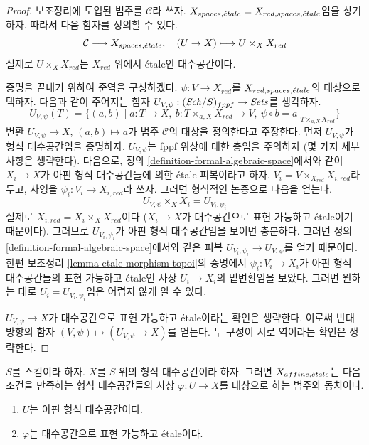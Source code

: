 \begin{proof}
보조정리에 도입된 범주를 $\mathcal{C}$라 쓰자.
$X_{spaces, {\acute{e}tale}} = X_{red, spaces, {\acute{e}tale}}$임을 상기하자.
따라서 다음 함자를 정의할 수 있다.
$$
\mathcal{C} \longrightarrow X_{spaces, {\acute{e}tale}},\quad
(U \to X) \longmapsto U \times_X X_{red}
$$
실제로 $U \times_X X_{red}$는 $X_{red}$ 위에서 \'etale인
대수공간이다.

\medskip\noindent
증명을 끝내기 위하여 준역을 구성하겠다.
$\psi : V \to X_{red}$를 $X_{red, spaces, {\acute{e}tale}}$의 대상으로
택하자. 다음과 같이 주어지는 함자
$U_{V, \psi} : (\mathit{Sch}/S)_{fppf} \to \textit{Sets}$를 생각하자.
$$
U_{V, \psi}(T) = \{(a, b) \mid
a : T \to X,
\ b : T \times_{a, X} X_{red} \to V,
\ \psi \circ b = a|_{T \times_{a, X} X_{red}}\}
$$
변환 $U_{V, \psi} \to X$, $(a, b) \mapsto a$가
범주 $\mathcal{C}$의 대상을 정의한다고 주장한다.
먼저 $U_{V, \psi}$가 형식 대수공간임을 증명하자.
$U_{V, \psi}$는 fppf 위상에 대한 층임을 주의하자
(몇 가지 세부 사항은 생략한다). 다음으로, 정의
\ref{definition-formal-algebraic-space}에서와 같이
$X_i \to X$가 아핀 형식 대수공간들에 의한 \'etale 피복이라고 하자.
$V_i = V \times_{X_{red}} X_{i, red}$라 두고, 사영을
$\psi_i : V_i \to X_{i, red}$라 쓰자. 그러면 형식적인 논증으로
다음을 얻는다.
$$
U_{V, \psi} \times_X X_i = U_{V_i, \psi_i}
$$
실제로 $X_{i, red} = X_i \times_X X_{red}$이다
($X_i \to X$가 대수공간으로 표현 가능하고 \'etale이기 때문이다).
그러므로 $U_{V_i, \psi_i}$가 아핀 형식 대수공간임을 보이면 충분하다.
그러면 정의 \ref{definition-formal-algebraic-space}에서와 같은 피복
$U_{V_i, \psi_i} \to U_{V, \psi}$를 얻기 때문이다.
한편 보조정리 \ref{lemma-etale-morphism-topoi}의 증명에서
$\psi_i : V_i \to X_i$가 아핀 형식 대수공간들의 표현 가능하고
\'etale인 사상 $U_i \to X_i$의 밑변환임을 보았다.
그러면 원하는 대로 $U_i = U_{V_i, \psi_i}$임은 어렵지 않게 알 수 있다.

\medskip\noindent
$U_{V, \psi} \to X$가 대수공간으로 표현 가능하고 \'etale이라는
확인은 생략한다. 이로써 반대 방향의 함자
$(V, \psi) \mapsto (U_{V, \psi} \to X)$를 얻는다.
두 구성이 서로 역이라는 확인은 생략한다.
\end{proof}

\begin{lemma}
\label{lemma-identify-affine-etale}
$S$를 스킴이라 하자. $X$를 $S$ 위의 형식 대수공간이라 하자.
그러면 $X_{affine, {\acute{e}tale}}$는 다음 조건을 만족하는 형식
대수공간들의 사상 $\varphi : U \to X$를 대상으로 하는 범주와 동치이다.
\begin{enumerate}
\item $U$는 아핀 형식 대수공간이다.
\item $\varphi$는 대수공간으로 표현 가능하고 \'etale이다.
\end{enumerate}
\end{lemma}

